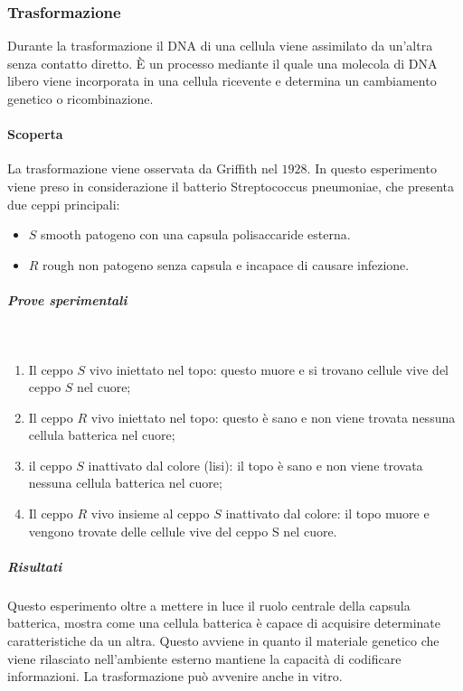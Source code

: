 		\subsubsection{Trasformazione}
		Durante la trasformazione il DNA di una cellula viene assimilato da un'altra senza contatto diretto.
		\`E un processo mediante il quale una molecola di DNA libero viene incorporata in una cellula ricevente e determina un cambiamento genetico o ricombinazione.

			\paragraph{Scoperta}
			La trasformazione viene osservata da Griffith nel $1928$.
			In questo esperimento viene preso in considerazione il batterio Streptococcus pneumoniae, che presenta due ceppi principali:
			\begin{multicols}{2}
				\begin{itemize}
					\item $S$ smooth patogeno con una capsula polisaccaride esterna.
					\item $R$ rough non patogeno senza capsula e incapace di causare infezione.
				\end{itemize}
			\end{multicols}
				
				\subparagraph{Prove sperimentali}\mbox{}\\
				\begin{multicols}{2}
					\begin{enumerate}
    						\item Il ceppo $S$ vivo iniettato nel topo: questo muore e si trovano cellule vive del ceppo $S$ nel cuore; 
    						\item Il ceppo $R$ vivo iniettato nel topo: questo è sano e non viene trovata nessuna cellula batterica nel cuore;
    						\item il ceppo $S$ inattivato dal colore (lisi): il topo è sano e non viene trovata nessuna cellula batterica nel cuore; 
    						\item Il ceppo $R$ vivo insieme al ceppo $S$ inattivato dal colore: il topo muore e vengono trovate delle cellule vive del ceppo S nel cuore.
					\end{enumerate}
				\end{multicols}

				\subparagraph{Risultati}
				Questo esperimento oltre a mettere in luce il ruolo centrale della capsula batterica, mostra come una cellula batterica è capace di acquisire determinate caratteristiche da un altra. 
				Questo avviene in quanto il materiale genetico che viene rilasciato nell'ambiente esterno mantiene la capacità di codificare informazioni.
				La trasformazione pu\`o avvenire anche in vitro.

